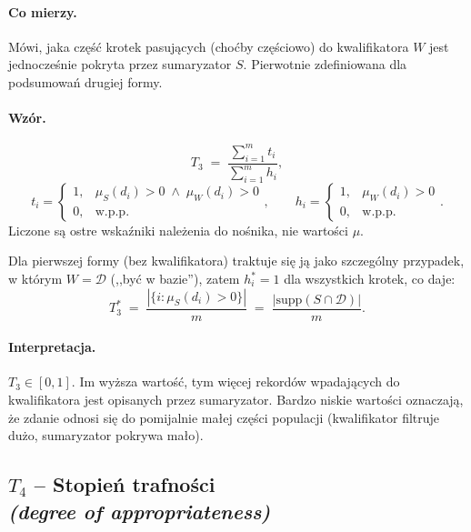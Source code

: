 \paragraph{Co mierzy.}
Mówi, jaka część krotek pasujących (choćby częściowo) do kwalifikatora
$W$ jest jednocześnie pokryta przez sumaryzator $S$. Pierwotnie
zdefiniowana dla podsumowań drugiej formy.

\paragraph{Wzór.}
\begin{equation}
\label{eq:T3}
    T_3 \;=\; \frac{\sum_{i=1}^{m} t_i}{\sum_{i=1}^{m} h_i},
\end{equation}
\begin{equation}
\label{eq:T3-ti}
    t_i = \begin{cases} 1, & \mu_S(d_i) > 0 \;\wedge\; \mu_W(d_i) > 0 \\ 0, & \text{w.p.p.}\end{cases},
    \qquad
    h_i = \begin{cases} 1, & \mu_W(d_i) > 0 \\ 0, & \text{w.p.p.}\end{cases}.
\end{equation}
Liczone są ostre wskaźniki należenia do nośnika, nie wartości $\mu$.

Dla pierwszej formy (bez kwalifikatora) traktuje się ją jako szczególny
przypadek, w którym $W = \mathcal{D}$ (,,być w bazie''), zatem
$h_i^{*} = 1$ dla wszystkich krotek, co daje:
\begin{equation}
\label{eq:T3-star}
    T_3^{*} \;=\; \frac{|\{ i : \mu_S(d_i) > 0\}|}{m} \;=\; \frac{|\mathrm{supp}(S \cap \mathcal{D})|}{m}.
\end{equation}

\paragraph{Interpretacja.}
$T_3 \in [0, 1]$. Im wyższa wartość, tym więcej rekordów wpadających
do kwalifikatora jest opisanych przez sumaryzator. Bardzo niskie
wartości oznaczają, że zdanie odnosi się do pomijalnie małej części
populacji (kwalifikator filtruje dużo, sumaryzator pokrywa mało).

\subsection*{$T_4$ -- Stopień trafności \\
\textit{(degree of appropriateness)}}

